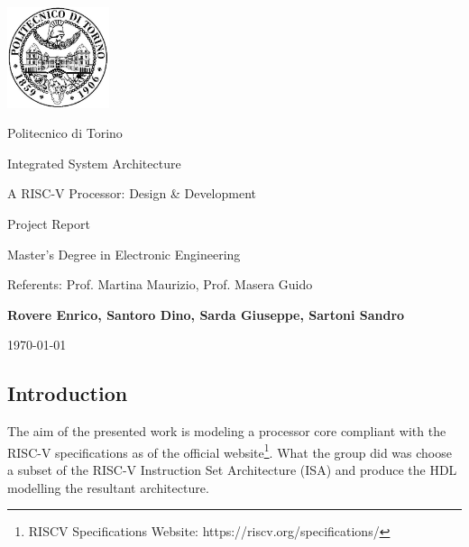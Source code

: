 \documentclass[10pt,  english, makeidx, a4paper, titlepage, oneside]{book}
\begin{document}
\frontmatter
\begin{titlepage}
\vspace{0cm}
\centerline{
\includegraphics[width=3cm]{pics/logopoli}} 
\vspace{0.5cm}
\centerline{\LARGE Politecnico di Torino}
\vspace{2.5cm}
\centerline{\huge\sf Integrated System Architecture}
\vspace{1cm}
\centerline{\Huge\sf A RISC-V Processor: Design \& Development}
\bigskip
\centerline{\huge\sf Project Report}
\vspace{2cm}
\centerline{\Large Master's Degree in Electronic Engineering}
\bigskip
\vspace{2.5cm}
%
\centerline{\large Referents: Prof. Martina Maurizio, Prof. Masera Guido}
\bigskip
\vspace{1cm}
%
%
%
%
\centerline{\Large \textbf{Rovere Enrico, Santoro Dino, Sarda Giuseppe, Sartoni Sandro}}
%
\vspace{1.5cm}
\centerline{\large \today}
\end{titlepage}

\tableofcontents

\newpage

\subsection*{Introduction}
The aim of the presented work is modeling a processor core compliant with the RISC-V specifications as of the official website\footnote{RISCV Specifications Website: https://riscv.org/specifications/}.
What the group did was choose a subset of the RISC-V Instruction Set Architecture (ISA) and produce the HDL modelling the resultant architecture. 
\end{document}
